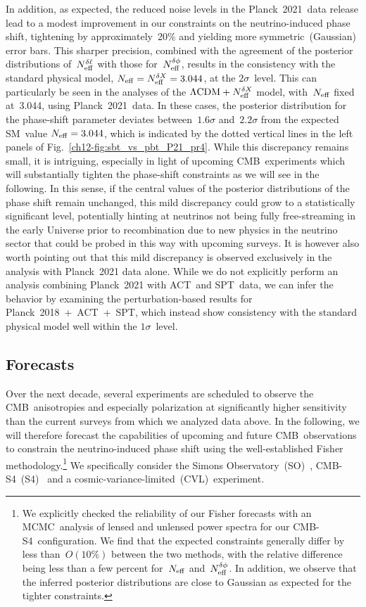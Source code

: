 In addition, as expected, the reduced noise levels in the Planck~2021~data release lead to a modest improvement in our constraints on the neutrino-induced phase shift, tightening by approximately~20\% and yielding more symmetric~(Gaussian) error bars. This sharper precision, combined with the agreement of the posterior distributions of~$N_\mathrm{eff}^{\delta\ell}$ with those for~$N_\mathrm{eff}^{\delta\phi}$, results in the consistency with the standard physical model, $N_\mathrm{eff} = N_\mathrm{eff}^{\delta X} = 3.044$, at the $2\sigma$~level. This can particularly be seen in the analyses of the $\Lambda\mathrm{CDM} + N_\mathrm{eff}^{\delta X}$ model, with~$N_\mathrm{eff}$ fixed at~3.044, using Planck~2021~data. In these cases, the posterior distribution for the phase-shift parameter deviates between~$1.6\sigma$ and~$2.2\sigma$ from the expected SM~value $N_\mathrm{eff}=3.044$, which is indicated by the dotted vertical lines in the left panels of Fig.~\ref{ch12-fig:sbt_vs_pbt_P21_pr4}. While this discrepancy remains small, it is intriguing, especially in light of upcoming CMB~experiments which will substantially tighten the phase-shift constraints as we will see in the following. In this sense, if the central values of the posterior distributions of the phase shift remain unchanged, this mild discrepancy could grow to a statistically significant level, potentially hinting at neutrinos not being fully free-streaming in the early Universe prior to recombination due to new physics in the neutrino sector that could be probed in this way with upcoming surveys. It is however also worth pointing out that this mild discrepancy is observed exclusively in the analysis with Planck~2021 data alone. While we do not explicitly perform an analysis combining Planck~2021 with ACT~and SPT~data, we can infer the behavior by examining the perturbation-based results for \mbox{Planck~2018 + ACT + SPT}, which instead show consistency with the standard physical model well within the $1\sigma$~level.


\subsection{Forecasts}
\label{ch12-sec:forecasts}

Over the next decade, several experiments are scheduled to observe the CMB~anisotropies and especially polarization at significantly higher sensitivity than the current surveys from which we analyzed data above. In the following, we will therefore forecast the capabilities of upcoming and future CMB~observations to constrain the neutrino-induced phase shift using the well-established Fisher methodology.\footnote{We explicitly checked the reliability of our Fisher forecasts with an MCMC~analysis of lensed and unlensed power spectra for our \mbox{CMB-S4}~configuration. We find that the expected constraints generally differ by less than~$O(10\%)$ between the two methods, with the relative difference being less than a few percent for~$N_\mathrm{eff}$ and~$N_\mathrm{eff}^{\delta\phi}$. In addition, we observe that the inferred posterior distributions are close to Gaussian as expected for the tighter constraints.} We specifically consider the Simons Observatory~(SO)~\cite{SimonsObservatory:2018koc}, \mbox{CMB-S4}~(S4)~\cite{Abazajian:2019eic, CMB-S4:2022ght} and a cosmic-variance-limited~(CVL)~experiment.\medskip

